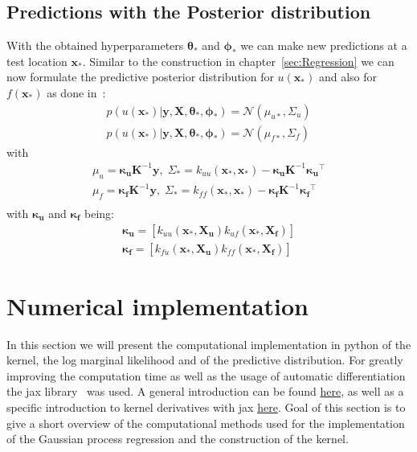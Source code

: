 \documentclass{article}
\begin{document}
\subsection{Predictions with the Posterior distribution}
With the obtained hyperparameters $\bm{\theta_*}$ and $\bm{\phi_*}$ we can make new predictions at a test location $\bm{x_*}$. Similar to the construction in chapter~\ref{sec:Regression} we can now formulate the predictive posterior distribution for $u(\bm{x_*})$ and also for $f(\bm{x_*})$ as done
in~\cite{RAISSI}:
\begin{equation}
    \begin{aligned}
        p(u(\bm{x_*})|\bm{y},\bm{X},\bm{\theta_*}, \bm{\phi_*}) = \mathcal{N}(\mu_{u*}, \Sigma_u) \\
        p(u(\bm{x_*})|\bm{y},\bm{X},\bm{\theta_*}, \bm{\phi_*}) = \mathcal{N}(\mu_{f*}, \Sigma_f)
    \end{aligned}
\end{equation}
with
\begin{equation}
    \begin{aligned}
        \label{eq:predictive_mean_cov}
        \mu_u = \bm{\kappa_u}\bm{K}^{-1}\bm{y}, \; \Sigma_* = k_{uu}(\bm{x_*,x_*}) - \bm{\kappa_u}\bm{K}^{-1}\bm{\kappa_u}^\intercal  \\
        \mu_f = \bm{\kappa_f}\bm{K}^{-1}\bm{y}, \;  \Sigma_* = k_{ff}(\bm{x_*,x_*}) - \bm{\kappa_f}\bm{K}^{-1}\bm{\kappa_f}^\intercal \\
    \end{aligned}
\end{equation}
with $\bm{\kappa_u}$ and $\bm{\kappa_f}$ being:
\begin{equation}
    \begin{aligned}
        \bm{\kappa_u} = [k_{uu}(\bm{x_*},\bm{X_u})k_{uf}(\bm{x_*,\bm{X_f}})] \\
        \bm{\kappa_f} = [k_{fu}(\bm{x_*},\bm{X_u})k_{ff}(\bm{x_*,\bm{X_f}})]
    \end{aligned}
\end{equation}
\new
\section{Numerical implementation}
In this section we will present the computational implementation in python of the kernel, the log marginal likelihood and of the predictive distribution. For greatly improving the computation time as well as the usage of automatic differentiation the jax library~\cite{jax2018github} was used. A general introduction can be found \href{https://jax.readthedocs.io/en/latest/notebooks/quickstart.html}{here}, as well as a specific introduction to kernel derivatives with jax \href{https://jejjohnson.github.io/research_notebook/content/notes/kernels/kernel_derivatives.html}{here}. Goal of this section is to give a short overview of the computational methods used for the implementation of the Gaussian process regression and the construction of the kernel.\\
\end{document}
